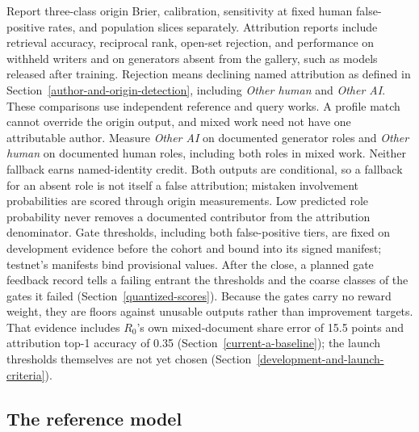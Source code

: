 Report three-class origin Brier, calibration, sensitivity at fixed human
false-positive rates, and population slices separately. Attribution reports
include retrieval accuracy, reciprocal rank, open-set rejection, and performance
on withheld writers and on generators absent from the gallery, such as models
released after training. Rejection means declining named attribution
as defined in Section~\ref{author-and-origin-detection}, including
\emph{Other human} and \emph{Other AI}. These comparisons use independent
reference and query works. A profile match cannot override the origin output,
and mixed work need not have one attributable author. Measure \emph{Other AI} on
documented generator roles and \emph{Other human} on documented human roles,
including both roles in mixed work. Neither fallback earns named-identity credit.
Both outputs are conditional, so a fallback for an absent role is not itself a
false attribution; mistaken involvement probabilities are scored through origin
measurements. Low predicted role probability never removes a documented
contributor from the attribution denominator. Gate thresholds, including both
false-positive tiers, are fixed on development evidence before the cohort and
bound into its signed manifest; testnet's manifests bind provisional values.
After the close, a planned gate feedback record tells a failing entrant the
thresholds and the coarse classes of the gates it failed
(Section~\ref{quantized-scores}). Because the gates carry no reward weight,
they are floors against unusable outputs rather than improvement targets. That
evidence includes \(R_0\)'s own mixed-document share error of 15.5 points and
attribution top-1 accuracy of 0.35 (Section~\ref{current-a-baseline}); the
launch thresholds themselves are not yet chosen
(Section~\ref{development-and-launch-criteria}).

\subsection{The reference model}\label{reference-model}

